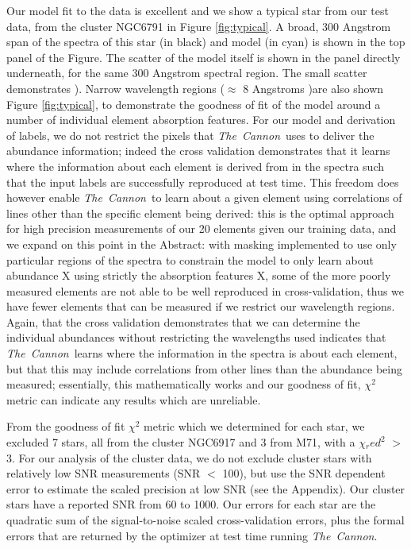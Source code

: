 \documentclass[14pt, preprint2]{aastex6}
\newcommand{\project}[1]{\textsl{#1}}
\newcommand{\tc}{\project{The~Cannon}}
\begin{document}
Our model fit to the data is excellent and we show a typical star from our test data, from the cluster NGC6791 in Figure \ref{fig:typical}. A broad, 300 Angstrom span of the spectra of this star (in black) and model (in cyan) is shown in the top panel of the Figure. The scatter of the model itself is shown in the panel directly underneath, for the same 300 Angstrom spectral region. The small scatter demonstrates \citet{Ness2015}). Narrow wavelength regions ($\approx$ 8 Angstroms )are also shown Figure \ref{fig:typical}, to demonstrate the goodness of fit of the model around a number of individual element absorption features. For our model and derivation of labels, we do not restrict the pixels that \tc\ uses to deliver the abundance information; indeed the cross validation demonstrates that it learns where the information about each element is derived from in the spectra such that the input labels are successfully reproduced at test time. This freedom does however enable \tc\ to learn about a given element using correlations of lines other than the specific element being derived: this is the optimal approach for high precision measurements of our 20 elements given our training data, and we expand on this point in the Abstract: with masking implemented to use only particular regions of the spectra to constrain the model to only learn about abundance X using strictly the absorption features X, some of the more poorly measured elements are not able to be well reproduced in cross-validation, thus we have fewer elements that can be measured if we restrict our wavelength regions. Again, that the cross validation demonstrates that we can determine the individual abundances without restricting the wavelengths used indicates that \tc\ learns where the information in the spectra is about each element, but that this may include correlations from other lines than the abundance being measured; essentially, this mathematically works and our goodness of fit, $\chi^2$ metric can indicate any results which are unreliable. 

From the goodness of fit $\chi^2$ metric which we determined for each star, we excluded 7 stars, all from the cluster NGC6917 and 3 from M71, with a $\chi{_red}^2$ $>$ 3. For our analysis of the cluster data, we do not exclude cluster stars with relatively low SNR measurements (SNR $<$ 100), but use the SNR dependent error to estimate the scaled precision at low SNR (see the Appendix). Our cluster stars have a reported SNR from 60 to 1000. Our errors for each star are the quadratic sum of the signal-to-noise scaled cross-validation errors, plus the formal errors that are returned by the optimizer at test time running \tc. 
\end{document}
